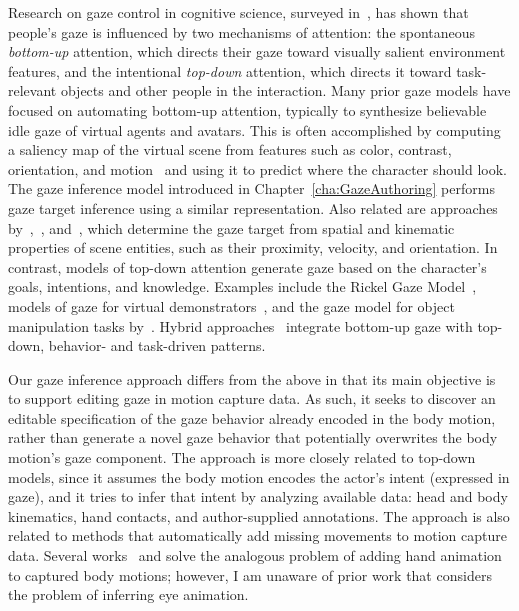 Research on gaze control in cognitive science, surveyed in~\citep{henderson2003human}, has shown that people's gaze is influenced by two mechanisms of attention: the spontaneous \emph{bottom-up} attention, which directs their gaze toward visually salient environment features, and the intentional \emph{top-down} attention, which directs it toward task-relevant objects and other people in the interaction.
Many prior gaze models have focused on automating bottom-up attention, typically to synthesize believable idle gaze of virtual agents and avatars. This is often accomplished by computing a saliency map of the virtual scene from features such as color, contrast, orientation, and motion~\citep{peters2003bottomup,peters2008applying} and using it to predict where the character should look. The gaze inference model introduced in Chapter~\ref{cha:GazeAuthoring} performs gaze target inference using a similar representation.
Also related are approaches by~\citet{cafaro2009animating},~\citet{grillon2009crowds}, and~\citet{kokkinara2011modelling}, which determine the gaze target from spatial and kinematic properties of scene entities, such as their proximity, velocity, and orientation. In contrast, models of top-down attention generate gaze based on the character's goals, intentions, and knowledge. Examples include the Rickel Gaze Model~\citep{lee2007rickel}, models of gaze for virtual demonstrators~\citep{huang2016planning}, and the gaze model for object manipulation tasks by~\citet{bai2012synthesis}. Hybrid approaches~\citep{khullar2001look,mitake2007reactive} integrate bottom-up gaze with top-down, behavior- and task-driven patterns.

Our gaze inference approach differs from the above in that its main objective is to support editing gaze in motion capture data. As such, it seeks to discover an editable specification of the gaze behavior already encoded in the body motion, rather than generate a novel gaze behavior that potentially overwrites the body motion's gaze component. The approach is more closely related to top-down models, since it assumes the body motion encodes the actor's intent (expressed in gaze), and it tries to infer that intent by analyzing available data: head and body kinematics, hand contacts, and author-supplied annotations.
The approach is also related to methods that automatically add missing movements to motion capture data. Several works~\citep{jorg2012finger} and \citep{ye2012hand} solve the analogous problem of adding hand animation to captured body motions; however, I am unaware of prior work that considers the problem of inferring eye animation.

